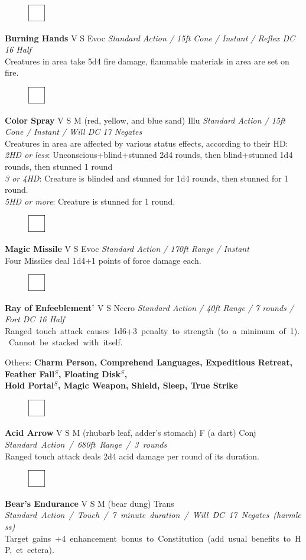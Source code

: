 \documentclass[letterpaper]{article}
\newcommand{\e}[1]{\emph{#1}}
\newcommand{\B}[1]{\textbf{#1}}
\newcommand{\s}[0]{$^S$}
\newcommand{\D}[0]{$^\dag$}
\newcommand{\spell}[7]{
\begin{figure}
\vspace{-13pt}
\ifstrequal{#2}{Full}{  \includegraphics[width=2em]{Checkbox-Full}}{
\ifstrequal{#2}{Scroll}{\includegraphics[width=2em]{Checkbox-S}}{
                        \includegraphics[width=2em]{Checkbox}}}
\ifstrequal{#7}{}{\vspace{-1em}}{\vspace{#7}}
\end{figure}
 \B{#1} #3 {
    \ifstrequal{#4}{Conj}{\color{Plum}Conj}{%
    \ifstrequal{#4}{Divin}{\color{YellowOrange}Divin}{%
    \ifstrequal{#4}{Ench}{\color{VioletRed}Ench}{%
    \ifstrequal{#4}{Trans}{\color{LimeGreen}Trans}{%
    \ifstrequal{#4}{Evoc}{\color{RedOrange}Evoc}{%
    \ifstrequal{#4}{Illu}{\color{ProcessBlue}Illu}{%
    \ifstrequal{#4}{Abjur}{\color{CadetBlue}Abjur}{%
    \ifstrequal{#4}{Necro}{\color{Red}Necro}{%
}}}}}}}}}
{\footnotesize \e{#5}} \\
#6
}
\begin{document}
\spell{Burning Hands}{}{V S}{Evoc}{Standard Action / 15ft Cone / Instant / Reflex DC 16 Half}{%
Creatures in area take 5d4 fire damage, flammable materials in area are set on fire.}{}\\[-1em] %

\spell{Color Spray}{}{V S M (red, yellow, and blue sand)}{Illu}{Standard Action / 15ft Cone / Instant / Will DC 17 Negates}{%
Creatures in area are affected by various status effects, according to their HD:\\
\e{2HD or less}: Unconscious+blind+stunned 2d4 rounds, then blind+stunned 1d4 rounds, then stunned 1 round \\
\e{3 or 4HD}: Creature is blinded and stunned for 1d4 rounds, then stunned for 1 round.\\
\e{5HD or more}: Creature is stunned for 1 round.}{1em}

\spell{Magic Missile}{}{V S}{Evoc}{Standard Action / 170ft Range / Instant}{%
Four Missiles deal 1d4+1 points of force damage each.}{} \\[-1em] %

\spell{Ray of Enfeeblement\D}{}{V S}{Necro}{Standard Action / 40ft Range / 7 rounds / Fort DC 16 Half}{%
\mbox{Ranged touch attack causes 1d6+3 penalty to strength (to a minimum of 1).  Cannot be stacked with itself.}}{} \\[-1em] %

\begin{adjustwidth}{3em}{0em}
Others: \B{Charm Person, Comprehend Languages, Expeditious Retreat, Feather Fall\s , Floating Disk\s ,\\ Hold Portal\s , Magic Weapon, Shield, Sleep, True Strike} \\
\end{adjustwidth}

\spell{Acid Arrow}{}{V S M (rhubarb leaf, adder's stomach) F (a dart)}{Conj}{\mbox{Standard Action / 680ft Range / 3 rounds}}{%
Ranged touch attack deals 2d4 acid damage per round of its duration.}{}\\[-1em] %

\spell{Bear's Endurance}{}{V S M (bear dung)}{Trans}{\mbox{Standard Action / Touch / 7 minute duration / Will DC 17 Negates (harmless)}} {%
\mbox{Target gains +4 enhancement bonus to Constitution (add usual benefits to HP, et cetera).} }{}\\[-1em] %
\end{document}

